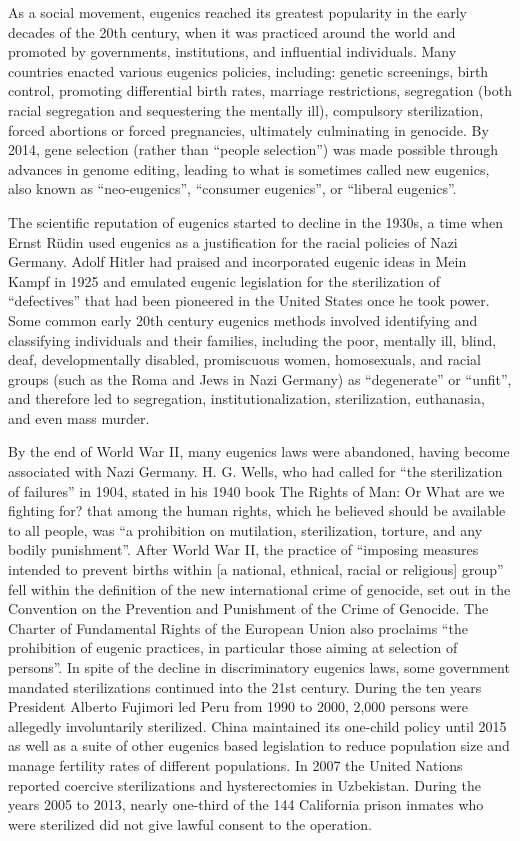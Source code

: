 As a social movement, eugenics reached its greatest popularity in the early decades of the 20th century, when it was practiced around the world and promoted by governments, institutions, and influential individuals. Many countries enacted various eugenics policies, including: genetic screenings, birth control, promoting differential birth rates, marriage restrictions, segregation (both racial segregation and sequestering the mentally ill), compulsory sterilization, forced abortions or forced pregnancies, ultimately culminating in genocide. By 2014, gene selection (rather than ``people selection'') was made possible through advances in genome editing, leading to what is sometimes called new eugenics, also known as ``neo-eugenics'', ``consumer eugenics'', or ``liberal eugenics''.

The scientific reputation of eugenics started to decline in the 1930s, a time when Ernst Rüdin used eugenics as a justification for the racial policies of Nazi Germany. Adolf Hitler had praised and incorporated eugenic ideas in Mein Kampf in 1925 and emulated eugenic legislation for the sterilization of ``defectives'' that had been pioneered in the United States once he took power. Some common early 20th century eugenics methods involved identifying and classifying individuals and their families, including the poor, mentally ill, blind, deaf, developmentally disabled, promiscuous women, homosexuals, and racial groups (such as the Roma and Jews in Nazi Germany) as ``degenerate'' or ``unfit'', and therefore led to segregation, institutionalization, sterilization, euthanasia, and even mass murder.

By the end of World War II, many eugenics laws were abandoned, having become associated with Nazi Germany. H. G. Wells, who had called for ``the sterilization of failures'' in 1904, stated in his 1940 book The Rights of Man: Or What are we fighting for? that among the human rights, which he believed should be available to all people, was ``a prohibition on mutilation, sterilization, torture, and any bodily punishment''. After World War II, the practice of ``imposing measures intended to prevent births within {[}a national, ethnical, racial or religious{]} group'' fell within the definition of the new international crime of genocide, set out in the Convention on the Prevention and Punishment of the Crime of Genocide. The Charter of Fundamental Rights of the European Union also proclaims ``the prohibition of eugenic practices, in particular those aiming at selection of persons''. In spite of the decline in discriminatory eugenics laws, some government mandated sterilizations continued into the 21st century. During the ten years President Alberto Fujimori led Peru from 1990 to 2000, 2,000 persons were allegedly involuntarily sterilized. China maintained its one-child policy until 2015 as well as a suite of other eugenics based legislation to reduce population size and manage fertility rates of different populations. In 2007 the United Nations reported coercive sterilizations and hysterectomies in Uzbekistan. During the years 2005 to 2013, nearly one-third of the 144 California prison inmates who were sterilized did not give lawful consent to the operation.

